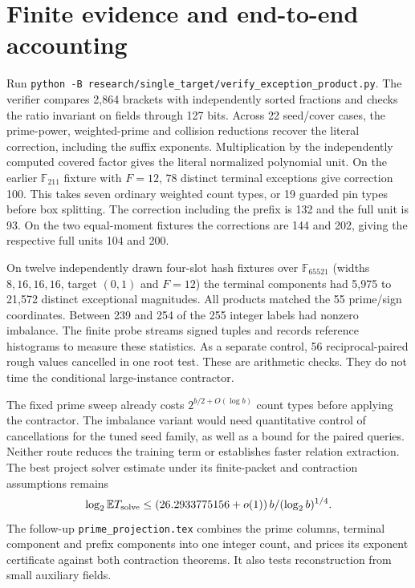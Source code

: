 \documentclass[11pt]{article}
\begin{document}
\section{Finite evidence and end-to-end accounting}
Run \texttt{python -B research/single\_target/verify\_exception\_product.py}.
The verifier compares 2,864 brackets with independently sorted
fractions and checks the ratio invariant on fields through 127 bits.
Across 22 seed/cover cases, the prime-power, weighted-prime and
collision reductions recover the literal correction, including
the suffix exponents. Multiplication by the independently computed
covered factor gives the literal normalized polynomial unit.
On the earlier $\mathbb F_{211}$ fixture with $F=12$, 78 distinct
terminal exceptions give correction 100. This takes seven ordinary
weighted count types, or 19 guarded pin types before box splitting.
The correction including the prefix is 132 and the full unit is 93.
On the two equal-moment fixtures the corrections are 144 and 202,
giving the respective full units 104 and 200.

On twelve independently drawn four-slot hash fixtures over
$\mathbb F_{65521}$ (widths $8,16,16,16$, target $(0,1)$ and $F=12$)
the terminal components had 5,975 to 21,572 distinct exceptional
magnitudes. All products matched the 55 prime/sign coordinates.
Between 239 and 254 of the 255 integer labels had nonzero imbalance.
The finite probe streams signed tuples and records reference
histograms to measure these statistics. As a separate control,
56 reciprocal-paired rough values cancelled in one root test.
These are arithmetic checks. They do not time the conditional
large-instance contractor.

The fixed prime sweep already costs $2^{b/2+O(\log b)}$ count types
before applying the contractor. The imbalance variant would need
quantitative control of cancellations for the tuned seed family,
as well as a bound for the paired queries. Neither route reduces the
training term or establishes faster relation extraction. The best
project solver estimate under its finite-packet and contraction
assumptions remains
\[
 \log_2\mathbb E T_{\rm solve}\le (26.2933775156+o(1))\,
                                   b/(\log_2 b)^{1/4}.
\]
The follow-up \texttt{prime\_projection.tex} combines the prime
columns, terminal component and prefix components into one integer
count, and prices its exponent certificate against both contraction
theorems. It also tests reconstruction from small auxiliary fields.
\end{document}
